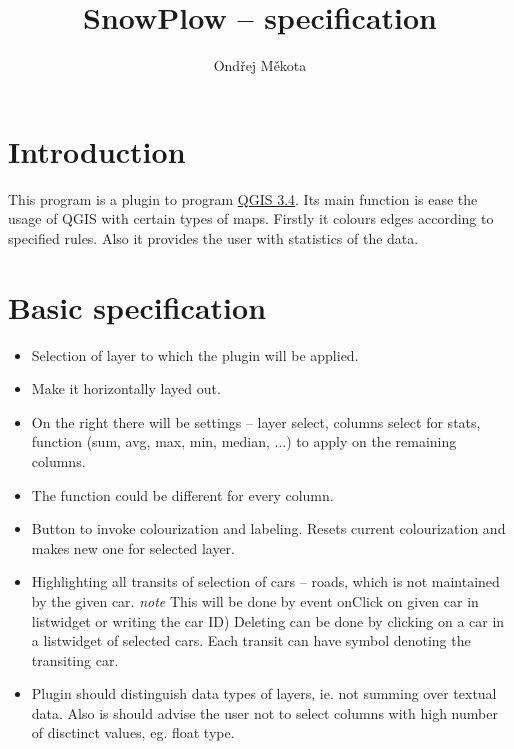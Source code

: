 \documentclass[12pt,a4paper]{article}
\begin{document}
\title{SnowPlow – specification}
\author{Ondřej Měkota}

\maketitle
\pagebreak
\section{Introduction}

\par This program is a plugin to program \href{https://qgis.org/en/site/index.html}{QGIS 3.4}. 
Its main function is ease the usage of QGIS with certain types of maps.
Firstly it colours edges according to specified rules.
Also it provides the user with statistics of the data.


\section{Basic specification}
\begin{itemize}
    \item Selection of layer to which the plugin will be applied.
    \item Make it horizontally layed out.
    \item On the right there will be settings – layer select, columns select for stats, function (sum, avg, max, min, median,  ...) to apply on the remaining columns.

    \item The function could be different for every column.
    \item Button to invoke colourization and labeling. Resets current colourization and makes new one for selected layer.
    \item Highlighting all transits of selection of cars – roads, which is not maintained by the given car. 
        \emph{note} This will be done by event onClick on given car in listwidget or writing the car ID)
        Deleting can be done by clicking on a car in a listwidget of selected cars.
        Each transit can have symbol denoting the transiting car.
    \item Plugin should distinguish data types of layers, ie. not summing over textual data. Also is should advise the user not to select columns with high number of disctinct values, eg. float type.
        

\end{itemize}
\end{document}
